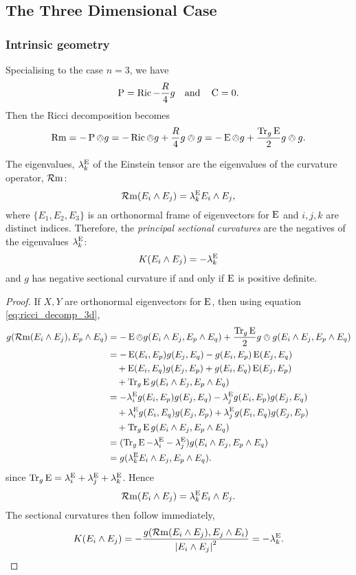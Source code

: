 \documentclass[a4paper, 12pt]{amsart}
\begin{document}
\subsection{The Three Dimensional Case}
\label{subsec:notation_threedim}

\subsubsection{Intrinsic geometry}
Specialising to the case \(n = 3\), we have
\[
\operatorname{P} = \operatorname{Ric} - \frac{R}{4} g \quad \text{and} \quad \operatorname{C} = 0.
\]
Then the Ricci decomposition becomes
\begin{equation}
\label{eq:ricci_decomp_3d}
\operatorname{Rm} = -\operatorname{P} \owedge g = -\operatorname{Ric} \owedge g + \frac{R}{4} g \owedge g = -\operatorname{E} \owedge g + \frac{\operatorname{Tr}_g \operatorname{E}}{2} g \owedge g.
\end{equation}
\begin{lemma}
\label{lem:eins_sectional}
The eigenvalues, \(\lambda^{\operatorname{E}}_k\) of the Einstein tensor are the eigenvalues of the curvature operator, \(\operatorname{\mathcal{R}m}\):
\[
\operatorname{\mathcal{R}m}(E_i \wedge E_j) = \lambda^{\operatorname{E}}_k E_i \wedge E_j
,\]
where \(\{E_1, E_2, E_3\}\) is an orthonormal frame of eigenvectors for \(\operatorname{E}\) and \(i,j,k\) are distinct indices. Therefore, the \emph{principal sectional curvatures} are the negatives of the eigenvalues \(\lambda^{\operatorname{E}}_k\):
\[
K(E_i \wedge E_j) = -\lambda^{\operatorname{E}}_k
\]
and \(g\) has negative sectional curvature if and only if \(\operatorname{E}\) is positive definite.
\end{lemma}
\begin{proof}
If \(X, Y\) are orthonormal eigenvectors for \(\operatorname{E}\), then using equation \eqref{eq:ricci_decomp_3d},
\[
\begin{split}
g(\operatorname{\mathcal{R}m}(E_i \wedge E_j), E_p \wedge E_q) &= -\operatorname{E} \owedge g (E_i \wedge E_j, E_p \wedge E_q) + \frac{\operatorname{Tr}_g \operatorname{E}}{2} g \owedge g (E_i \wedge E_j, E_p \wedge E_q) \\
&= - \operatorname{E}(E_i, E_p) g(E_j, E_q) - g(E_i, E_p) \operatorname{E}(E_j, E_q) \\
&\quad + \operatorname{E}(E_i, E_q) g(E_j, E_p) + g(E_i, E_q) \operatorname{E}(E_j, E_p) \\
&\quad + \operatorname{Tr}_g \operatorname{E} g(E_i \wedge E_j, E_p \wedge E_q) \\
&= - \lambda^{\operatorname{E}}_i g(E_i, E_p) g(E_j, E_q) - \lambda^{\operatorname{E}}_j g(E_i, E_p) g(E_j, E_q) \\
&\quad + \lambda^{\operatorname{E}}_i g(E_i, E_q) g(E_j, E_p) + \lambda^{\operatorname{E}}_j g(E_i, E_q) g(E_j, E_p) \\
&\quad + \operatorname{Tr}_g \operatorname{E} g(E_i \wedge E_j, E_p \wedge E_q) \\
&= (\operatorname{Tr}_g \operatorname{E} - \lambda^{\operatorname{E}}_i - \lambda^{\operatorname{E}}_j) g(E_i \wedge E_j, E_p \wedge E_q) \\
&= g(\lambda^{\operatorname{E}}_k E_i \wedge E_j, E_p \wedge E_q).
\end{split}
\]
since \(\operatorname{Tr}_g \operatorname{E} = \lambda^{\operatorname{E}}_i + \lambda^{\operatorname{E}}_j + \lambda^{\operatorname{E}}_k\). Hence
\[
\operatorname{\mathcal{R}m}(E_i \wedge E_j) = \lambda^{\operatorname{E}}_k E_i \wedge E_j.
\]
The sectional curvatures then follow immediately,
\[
K (E_i \wedge E_j) = -\frac{g(\operatorname{\mathcal{R}m}(E_i \wedge E_j), E_j \wedge E_i)}{\left\lvert{E_i \wedge E_j}\right\rvert^2} = -\lambda^{\operatorname{E}}_k.
\]
\end{proof}
\end{document}
